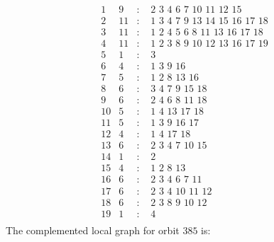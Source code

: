 \documentclass[12pt]{article}
\begin{document}
\begin{equation*}
\begin{array}{rrcl}
1&9&:&\,\,2\,\,3\,\,4\,\,6\,\,7\,\,10\,\,11\,\,12\,\,15\\
2&11&:&\,\,1\,\,3\,\,4\,\,7\,\,9\,\,13\,\,14\,\,15\,\,16\,\,17\,\,18\\
3&11&:&\,\,1\,\,2\,\,4\,\,5\,\,6\,\,8\,\,11\,\,13\,\,16\,\,17\,\,18\\
4&11&:&\,\,1\,\,2\,\,3\,\,8\,\,9\,\,10\,\,12\,\,13\,\,16\,\,17\,\,19\\
5&1&:&\,\,3\\
6&4&:&\,\,1\,\,3\,\,9\,\,16\\
7&5&:&\,\,1\,\,2\,\,8\,\,13\,\,16\\
8&6&:&\,\,3\,\,4\,\,7\,\,9\,\,15\,\,18\\
9&6&:&\,\,2\,\,4\,\,6\,\,8\,\,11\,\,18\\
10&5&:&\,\,1\,\,4\,\,13\,\,17\,\,18\\
11&5&:&\,\,1\,\,3\,\,9\,\,16\,\,17\\
12&4&:&\,\,1\,\,4\,\,17\,\,18\\
13&6&:&\,\,2\,\,3\,\,4\,\,7\,\,10\,\,15\\
14&1&:&\,\,2\\
15&4&:&\,\,1\,\,2\,\,8\,\,13\\
16&6&:&\,\,2\,\,3\,\,4\,\,6\,\,7\,\,11\\
17&6&:&\,\,2\,\,3\,\,4\,\,10\,\,11\,\,12\\
18&6&:&\,\,2\,\,3\,\,8\,\,9\,\,10\,\,12\\
19&1&:&\,\,4\\
\end{array}
\end{equation*}
The complemented local graph for orbit $385$ is:
\end{document}
